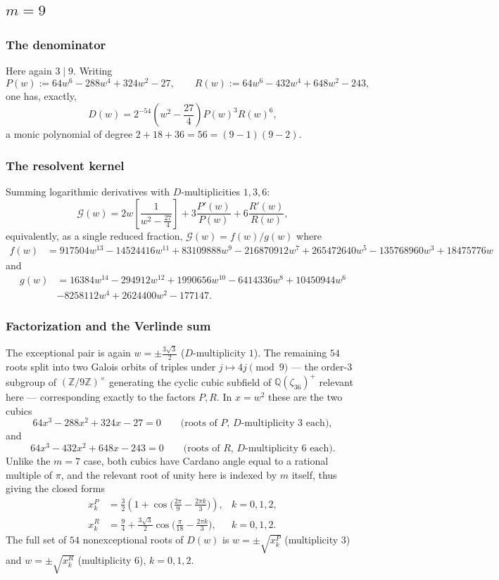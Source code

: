 \documentclass[11pt,reqno]{amsart}
\theoremstyle{remark}
\begin{document}
\subsection*{$m=9$}

\subsubsection*{The denominator}
Here again $3\mid9$. Writing
\[
P(w) := 64w^6-288w^4+324w^2-27, \qquad R(w) := 64w^6-432w^4+648w^2-243,
\]
one has, exactly,
\[
D(w) = 2^{-54}\left(w^2-\frac{27}{4}\right)P(w)^3R(w)^6,
\]
a monic polynomial of degree $2+18+36=56=(9-1)(9-2)$.

\subsubsection*{The resolvent kernel}
Summing logarithmic derivatives with $D$-multiplicities $1,3,6$:
\[
\mathcal G(w) = 2w\left[\frac{1}{w^2-\tfrac{27}{4}}\right] + 3\frac{P'(w)}{P(w)} + 6\frac{R'(w)}{R(w)},
\]
equivalently, as a single reduced fraction,
$\mathcal G(w) = f(w)/g(w)$
where
\begin{align*}
f(w) &=
917504w^{13} - 14524416w^{11} + 83109888w^{9} - 216870912w^{7} + 265472640w^{5} - 135768960w^{3} + 18475776w
\end{align*}
and
\begin{align*}
g(w) &= 16384w^{14}-294912w^{12}+1990656w^{10}-6414336w^8+10450944w^6\\&-8258112w^4+2624400w^2-177147.
\end{align*}

\subsubsection*{Factorization and the Verlinde sum}
The exceptional pair is again $w=\pm\tfrac{3\sqrt3}{2}$ ($D$-multiplicity $1$).
The remaining $54$ roots split into two Galois orbits of triples under $j\mapsto4j\pmod9$ — the order-$3$ subgroup of $(\mathbb Z/9\mathbb Z)^\times$ generating the cyclic cubic subfield of $\mathbb Q(\zeta_{36})^+$ relevant here — corresponding exactly
to the factors $P,R$. In $x=w^2$ these are the two cubics
\[
64x^3-288x^2+324x-27=0 \qquad\text{(roots of $P$, $D$-multiplicity $3$ each)},
\]
and
\[
64x^3-432x^2+648x-243=0 \qquad\text{(roots of $R$, $D$-multiplicity $6$ each)}.
\]
Unlike the $m=7$ case, both cubics have Cardano angle equal to a rational multiple of $\pi$, and the relevant root of unity
here is indexed by $m$ itself, thus giving the closed forms
\begin{align}
x_k^P &= \frac32\left(1+\cos\Big(\frac{2\pi}{9}-\frac{2\pi k}{3}\Big)\right), & k=0,1,2,\\
x_k^R &= \frac94 + \frac{3\sqrt3}{2}\cos\Big(\frac{\pi}{18}-\frac{2\pi k}{3}\Big), & k=0,1,2.
\end{align}
The full set of $54$ nonexceptional roots of $D(w)$ is $w=\pm\sqrt{x^P_k}$ (multiplicity $3$) and $w=\pm\sqrt{x^R_k}$ (multiplicity $6$), $k=0,1,2$.
\end{document}
